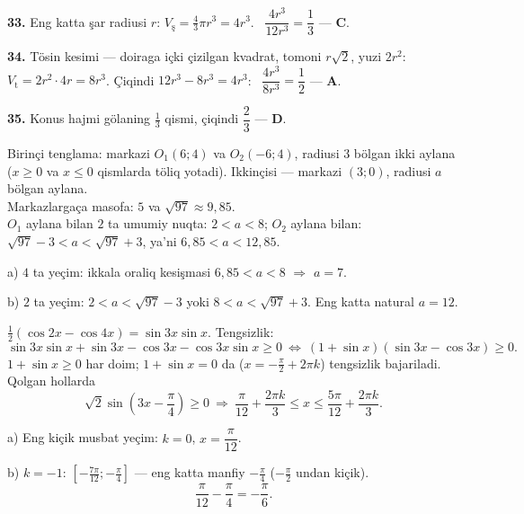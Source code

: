 \textbf{33.} Eng katta şar radiusi $r$: $V_{\text{ş}}=\frac43\pi r^3=4r^3$. \ $\dfrac{4r^3}{12r^3}=\dfrac13$ — \textbf{C}.

\textbf{34.} Tösin kesimi — doiraga içki çizilgan kvadrat, tomoni $r\sqrt2$, yuzi $2r^2$: $V_{\text{t}}=2r^2\cdot4r=8r^3$. Çiqindi $12r^3-8r^3=4r^3$: \ $\dfrac{4r^3}{8r^3}=\dfrac12$ — \textbf{A}.

\textbf{35.} Konus hajmi gölaning $\frac13$ qismi, çiqindi $\dfrac23$ — \textbf{D}.

\newpage
{}
Birinçi tenglama: markazi $O_1(6;4)$ va $O_2(-6;4)$, radiusi $3$ bölgan ikki aylana ($x\ge0$ va $x\le0$ qismlarda töliq yotadi). Ikkinçisi — markazi $(3;0)$, radiusi $a$ bölgan aylana.\\
Markazlargaça masofa: $5$ va $\sqrt{97}\approx9{,}85$.\\
$O_1$ aylana bilan $2$ ta umumiy nuqta: $2<a<8$; \quad $O_2$ aylana bilan: $\sqrt{97}-3<a<\sqrt{97}+3$, ya'ni $6{,}85<a<12{,}85$.

a) $4$ ta yeçim: ikkala oraliq kesişmasi $6{,}85<a<8$ $\Rightarrow$ $a=7$.

b) $2$ ta yeçim: $2<a<\sqrt{97}-3$ yoki $8<a<\sqrt{97}+3$. Eng katta natural $a=12$.

\newpage
{}
$\frac12(\cos2x-\cos4x)=\sin3x\sin x$. Tengsizlik:
\[\sin3x\sin x+\sin3x-\cos3x-\cos3x\sin x\ge0\ \Leftrightarrow\ (1+\sin x)\left(\sin3x-\cos3x\right)\ge0.\]
$1+\sin x\ge0$ har doim; $1+\sin x=0$ da ($x=-\frac\pi2+2\pi k$) tengsizlik bajariladi. Qolgan hollarda
\[\sqrt2\sin\left(3x-\frac\pi4\right)\ge0\ \Rightarrow\ \frac\pi{12}+\frac{2\pi k}3\le x\le\frac{5\pi}{12}+\frac{2\pi k}3.\]

a) Eng kiçik musbat yeçim: $k=0$, $x=\dfrac\pi{12}$.

b) $k=-1$: $\left[-\frac{7\pi}{12};-\frac\pi4\right]$ — eng katta manfiy $-\frac\pi4$ ($-\frac\pi2$ undan kiçik).
\[\frac\pi{12}-\frac\pi4=-\frac\pi6.\]

